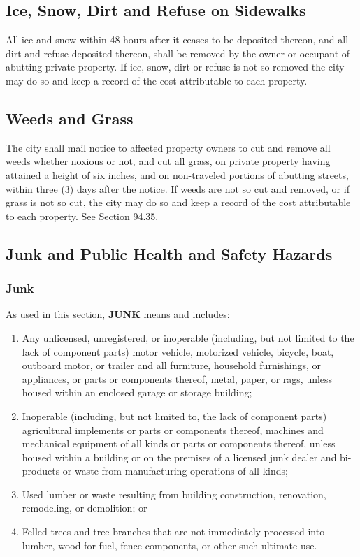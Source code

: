 \subsection{Ice, Snow, Dirt and Refuse on Sidewalks}
All ice and snow within 48 hours after it ceases to be deposited thereon, and all dirt and refuse deposited thereon, shall be removed by the owner or occupant of abutting private property.  If ice, snow, dirt or refuse is not so removed the city may do so and keep a record of the cost attributable to each property.
\subsection{Weeds and Grass}
The city shall mail notice to affected property owners to cut and remove all weeds whether noxious or not, and cut all grass, on private property having attained a height of six inches, and on non-traveled portions of abutting streets, within three (3) days after the notice. If weeds are not so cut and removed, or if grass is not so cut, the city may do so and keep a record of the cost attributable to each property. See Section 94.35.
\subsection{Junk and Public Health and Safety Hazards}
\subsubsection{Junk}  As used in this section, \textbf{JUNK} means and includes:
\begin{enumerate}[{\indent}a)]
    \item Any unlicensed, unregistered, or inoperable (including, but not limited to the lack of component parts) motor vehicle, motorized vehicle, bicycle, boat, outboard motor, or trailer and all furniture, household furnishings, or appliances, or parts or components thereof, metal, paper, or rags, unless housed within an enclosed garage or storage building; 
    \item Inoperable (including, but not limited to, the lack of component parts) agricultural implements or parts or components thereof, machines and mechanical equipment of all kinds or parts or components thereof, unless housed within a building or on the premises of a licensed junk dealer and bi-products or waste from manufacturing operations of all kinds; 
    \item Used lumber or waste resulting from building construction, renovation, remodeling, or demolition; or 
    \item Felled trees and tree branches that are not immediately processed into lumber, wood for fuel, fence components, or other such ultimate use.
\end{enumerate}

